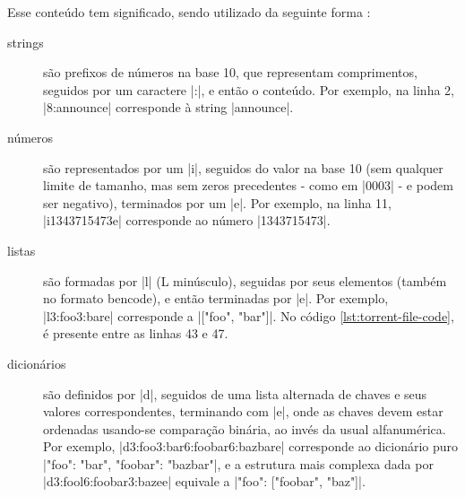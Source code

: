 Esse conteúdo tem significado, sendo utilizado da seguinte forma
\cite{wikitheory:bencoding}:

\begin{description}
    \item[\glspl*{string}] são prefixos de números na base 10, que representam
        comprimentos, seguidos por um caractere \bverb|:|, e então o conteúdo. Por
        exemplo, na linha 2, \bverb|8:announce| corresponde à \gls*{string}
        \sverb|announce|.

    \item[números] são representados por um \bverb|i|, seguidos do valor na
        base 10 (sem qualquer limite de tamanho, mas sem zeros precedentes - como em
        \bverb|0003| - e podem ser negativo), terminados por um \bverb|e|. Por exemplo,
        na linha 11, \bverb|i1343715473e| corresponde ao número \sverb|1343715473|.

    \item[listas] são formadas por \bverb|l| (L minúsculo), seguidas por seus elementos
        (também no formato \gls*{bencode}), e então terminadas por \bverb|e|. Por
        exemplo, \bverb|l3:foo3:bare| corresponde a \sverb|["foo", "bar"]|. No código
        \ref{lst:torrent-file-code}, é presente entre as linhas 43 e 47.

    \item[dicionários] são definidos por \bverb|d|, seguidos de uma lista
        alternada de chaves e seus valores correspondentes, terminando com \bverb|e|,
        onde as chaves devem estar ordenadas usando-se comparação binária, ao invés da
        usual alfanumérica. Por exemplo,
        \bverb|d3:foo3:bar6:foobar6:bazbare| corresponde ao dicionário puro \\
        \sverb|{"foo": "bar", "foobar": "bazbar"}|, e a estrutura mais complexa dada por
        \\ \bverb|d3:fool6:foobar3:bazee| equivale a \sverb|{"foo": ["foobar", "baz"]}|.
\end{description}


